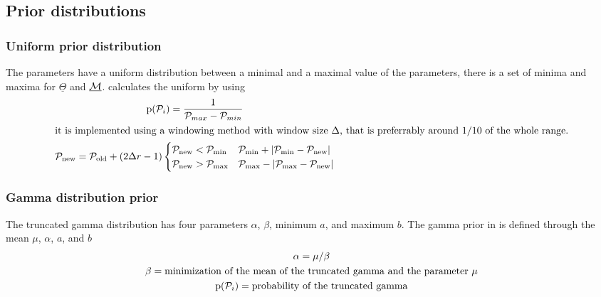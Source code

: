 
\subsection{Prior distributions}
\vskip -0.5cm
\subsubsection{Uniform prior distribution}
The parameters have a uniform distribution between a minimal and a maximal value of the parameters, there is a set of minima and maxima for $\underline{\Theta}$ and $\underline{\mathcal{M}}$.
\migrate calculates the uniform by using
\begin{gather}
\label{UNIPRIOR}
    {\rm p}(\mathcal{P}_i) =  \frac{1}{\mathcal{P}_{max} - \mathcal{P}_{min}} \\
    \intertext{it is implemented using a windowing method with window size $\Delta$, that is preferrably around 1/10 of the whole range.}
    \mathcal{P}_{\rm new} =  \mathcal{P}_{\rm old} + (2 \Delta r - 1) \begin{cases} \mathcal{P}_{\rm new} < \mathcal{P}_{\rm min}  &  \mathcal{P}_{\rm min} + |\mathcal{P}_{\rm min} - \mathcal{P}_{\rm new}| \\
     \mathcal{P}_{\rm new} > \mathcal{P}_{\rm max}  &  \mathcal{P}_{\rm max} - |\mathcal{P}_{\rm max} - \mathcal{P}_{\rm new}| \end{cases}
\end{gather}

\subsubsection{Gamma distribution prior}
The truncated gamma distribution has four parameters $\alpha$, $\beta$, minimum $a$, and maximum $b$. The gamma prior in \migrate is defined through the mean $\mu$, $\alpha$, $a$, and $b$ 
\begin{gather}
\label{GAMMAPRIOR}
%
\alpha = \mu / \beta\\
\beta = \text{minimization of the mean of the truncated gamma and the parameter $\mu$}  \\
\prob(\P_i) =  \text{probability of the truncated gamma} 
\end{gather}



